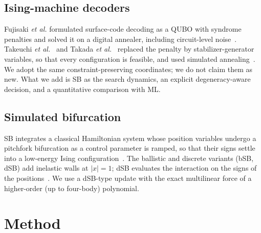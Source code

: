 \documentclass[journal]{IEEEtran}
\begin{document}
\subsection{Ising-machine decoders}
Fujisaki \emph{et al.} formulated surface-code decoding as a QUBO with syndrome penalties and solved it on a digital annealer, including circuit-level noise~\cite{fujisaki2022,fujisaki2023}. Takeuchi \emph{et al.}~\cite{takeuchi2023} and Takada \emph{et al.}~\cite{takada2024} replaced the penalty by stabilizer-generator variables, so that every configuration is feasible, and used simulated annealing~\cite{kirkpatrick1983}. We adopt the same constraint-preserving coordinates; we do not claim them as new. What we add is SB as the search dynamics, an explicit degeneracy-aware decision, and a quantitative comparison with ML.

\subsection{Simulated bifurcation}
SB integrates a classical Hamiltonian system whose position variables undergo a pitchfork bifurcation as a control parameter is ramped, so that their signs settle into a low-energy Ising configuration~\cite{goto2019}. The ballistic and discrete variants (bSB, dSB) add inelastic walls at $|x|=1$; dSB evaluates the interaction on the signs of the positions~\cite{goto2021}. We use a dSB-type update with the exact multilinear force of a higher-order (up to four-body) polynomial.

\section{Method}
\label{sec:method}
\end{document}
